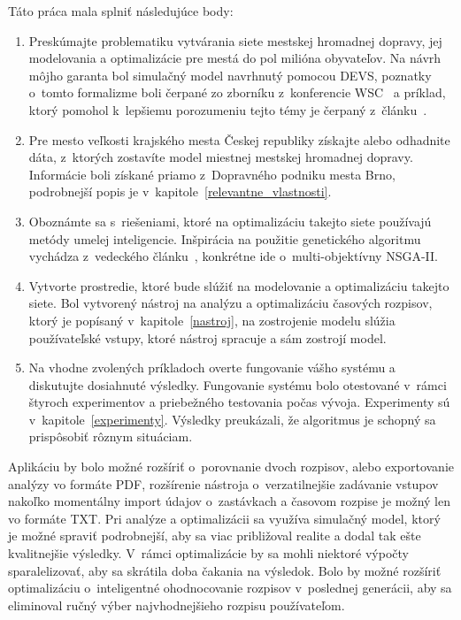 Táto práca mala splniť následujúce body:
\begin{enumerate}
  \item Preskúmajte problematiku vytvárania siete mestskej hromadnej dopravy, jej modelovania a optimalizácie pre mestá do pol milióna obyvateľov. Na návrh môjho garanta bol simulačný model navrhnutý pomocou DEVS, poznatky o~tomto formalizme boli čerpané zo zborníku z~konferencie WSC~\cite{tendeloo2018discrete} a príklad, ktorý pomohol k~lepšiemu porozumeniu tejto témy je čerpaný z~článku~\cite{seo2014devs}. 
  \item Pre mesto veľkosti krajského mesta Českej republiky získajte alebo odhadnite dáta, z~ktorých zostavíte model miestnej mestskej hromadnej dopravy. Informácie boli získané priamo z~Dopravného podniku mesta Brno, podrobnejší popis je v~kapitole~\ref{relevantne_vlastnosti}.
  \item Oboznámte sa s~riešeniami, ktoré na optimalizáciu takejto siete používajú metódy umelej inteligencie. Inšpirácia na použitie genetického algoritmu vychádza z~vedeckého článku~\cite{tang2021data}, konkrétne ide o~multi-objektívny NSGA-II.\@
  \item Vytvorte prostredie, ktoré bude slúžiť na modelovanie a optimalizáciu takejto siete. Bol vytvorený nástroj na analýzu a optimalizáciu časových rozpisov, ktorý je popísaný v~kapitole~\ref{nastroj}, na zostrojenie modelu slúžia používateľské vstupy, ktoré nástroj spracuje a sám zostrojí model.
  \item Na vhodne zvolených príkladoch overte fungovanie vášho systému a diskutujte dosiahnuté výsledky. Fungovanie systému bolo otestované v~rámci štyroch experimentov a priebežného testovania počas vývoja. Experimenty sú v~kapitole~\ref{experimenty}. Výsledky preukázali, že algoritmus je schopný sa prispôsobiť rôznym situáciam.
\end{enumerate}

Aplikáciu by bolo možné rozšíriť o~porovnanie dvoch rozpisov, alebo exportovanie analýzy vo formáte PDF, rozšírenie nástroja o~verzatilnejšie zadávanie vstupov nakoľko momentálny import údajov o~zastávkach a časovom rozpise je možný len vo formáte TXT.
Pri analýze a optimalizácii sa využíva simulačný model, ktorý je možné spraviť podrobnejší, aby sa viac približoval realite a dodal tak ešte kvalitnejšie výsledky.
V~rámci optimalizácie by sa mohli niektoré výpočty sparalelizovať, aby sa skrátila doba čakania na výsledok.
Bolo by možné rozšíriť optimalizáciu o~inteligentné ohodnocovanie rozpisov v~poslednej generácii, aby sa eliminoval ručný výber najvhodnejšieho rozpisu používateľom.
